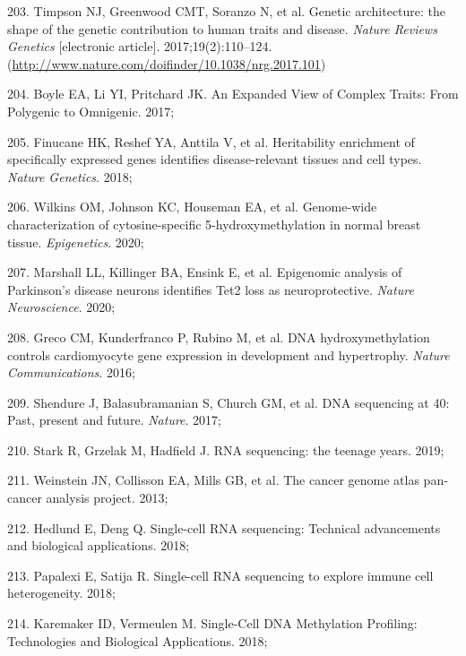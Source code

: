 \documentclass[11pt,oneside]{bristolthesis}
\newenvironment{cslreferences}%
  {}%
  {\par}
\begin{document}
\begin{cslreferences}
\leavevmode\hypertarget{ref-Timpson2017}{}%
203. Timpson NJ, Greenwood CMT, Soranzo N, et al. Genetic architecture: the shape of the genetic contribution to human traits and disease. \emph{Nature Reviews Genetics} {[}electronic article{]}. 2017;19(2):110--124. (\url{http://www.nature.com/doifinder/10.1038/nrg.2017.101})

\leavevmode\hypertarget{ref-Boyle2017}{}%
204. Boyle EA, Li YI, Pritchard JK. An Expanded View of Complex Traits: From Polygenic to Omnigenic. 2017;

\leavevmode\hypertarget{ref-Finucane2018}{}%
205. Finucane HK, Reshef YA, Anttila V, et al. Heritability enrichment of specifically expressed genes identifies disease-relevant tissues and cell types. \emph{Nature Genetics}. 2018;

\leavevmode\hypertarget{ref-Wilkins2020}{}%
206. Wilkins OM, Johnson KC, Houseman EA, et al. Genome-wide characterization of cytosine-specific 5-hydroxymethylation in normal breast tissue. \emph{Epigenetics}. 2020;

\leavevmode\hypertarget{ref-Marshall2020}{}%
207. Marshall LL, Killinger BA, Ensink E, et al. Epigenomic analysis of Parkinson's disease neurons identifies Tet2 loss as neuroprotective. \emph{Nature Neuroscience}. 2020;

\leavevmode\hypertarget{ref-Greco2016}{}%
208. Greco CM, Kunderfranco P, Rubino M, et al. DNA hydroxymethylation controls cardiomyocyte gene expression in development and hypertrophy. \emph{Nature Communications}. 2016;

\leavevmode\hypertarget{ref-Shendure2017}{}%
209. Shendure J, Balasubramanian S, Church GM, et al. DNA sequencing at 40: Past, present and future. \emph{Nature}. 2017;

\leavevmode\hypertarget{ref-Stark2019}{}%
210. Stark R, Grzelak M, Hadfield J. RNA sequencing: the teenage years. 2019;

\leavevmode\hypertarget{ref-Weinstein2013}{}%
211. Weinstein JN, Collisson EA, Mills GB, et al. The cancer genome atlas pan-cancer analysis project. 2013;

\leavevmode\hypertarget{ref-Hedlund2018}{}%
212. Hedlund E, Deng Q. Single-cell RNA sequencing: Technical advancements and biological applications. 2018;

\leavevmode\hypertarget{ref-Papalexi2018}{}%
213. Papalexi E, Satija R. Single-cell RNA sequencing to explore immune cell heterogeneity. 2018;

\leavevmode\hypertarget{ref-Karemaker2018}{}%
214. Karemaker ID, Vermeulen M. Single-Cell DNA Methylation Profiling: Technologies and Biological Applications. 2018;


\end{cslreferences}
\end{document}
